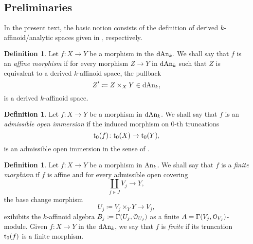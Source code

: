 \documentclass[10pt,a4paper,reqno]{amsart} %
\theoremstyle{plain}
\theoremstyle{definition}
\newtheorem{defin}[thm]{Definition}
\theoremstyle{remark}
\numberwithin{equation}{section}
\begin{document}
\subsection{Preliminaries}

In the present text, the basic notion consists of the definition of derived $k$-affinoid/analytic spaces given
in \cite[Definition 7.3 and Definition 2.5.]{Porta_Yu_Derived_non-archimedean_analytic_spaces}, respectively.


\begin{defin}
    Let $f \colon X \to Y$ be a morphism in the \infcat $\mathrm{dAn}_k$. We shall say that $f$ is an \emph{affine morphism} if
    for every morphism $Z \to Y$ in $\mathrm{dAn}_k$ such that $Z$ is equivalent to a derived $k$-affinoid space, the pullback
        \[
            Z' \coloneqq Z \times_X Y \in \mathrm{dAn}_k,  
        \]
    is a derived $k$-affinoid space.
\end{defin}

\begin{defin}
    Let $f \colon X \to Y$ be a morphism in $\mathrm{dAn}_k$. We shall say that $f$ is an \emph{admissible open immersion} if the induced morphism on $0$-th truncations
        \[
            \mathrm{t}_0(f) \colon \mathrm{t}_0(X) \to \mathrm{t}_0(Y),  
        \]
    is an admissible open immersion in the sense of \cite[\S 1.3]{Berkovich_Etale_1993}.
\end{defin}


\begin{defin}
    Let $f \colon X \to Y$ be a morphism in $\mathrm{An}_k$. We shall say that $f$ is a \emph{finite morphism} if $f$ is affine and for every admissible open covering
        \[
            \coprod_{j \in J} V_j \to Y,  
        \]
    the base change morphism
        \[
            U_j \coloneqq V_j \times_Y Y \to V_j,  
        \]
    exihibits the $k$-affinoid algebra $B_j \coloneqq \Gamma(U_j, \mathcal O_{U_j})$ as a finite $A = \Gamma(V_j, \mathcal O_{V_j})$-module.
    Given $f \colon X \to Y$ in the \infcat $\mathrm{dAn}_k$, we say that $f$ is \emph{finite} if its truncation $\mathrm{t}_0(f)$ is a finite
    morphism.
\end{defin}
\end{document}
